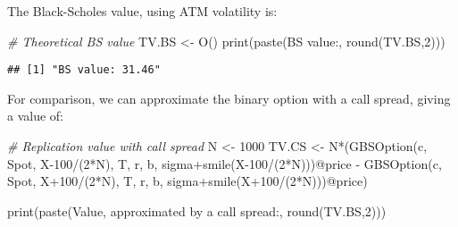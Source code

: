 \documentclass[]{tufte-book}
\newenvironment{Shaded}{}{}
\newcommand{\CommentTok}[1]{\textcolor[rgb]{0.38,0.63,0.69}{\textit{#1}}}
\newcommand{\DecValTok}[1]{\textcolor[rgb]{0.25,0.63,0.44}{#1}}
\newcommand{\FunctionTok}[1]{\textcolor[rgb]{0.02,0.16,0.49}{#1}}
\newcommand{\NormalTok}[1]{#1}
\newcommand{\OtherTok}[1]{\textcolor[rgb]{0.00,0.44,0.13}{#1}}
\newcommand{\SpecialCharTok}[1]{\textcolor[rgb]{0.25,0.44,0.63}{#1}}
\newcommand{\StringTok}[1]{\textcolor[rgb]{0.25,0.44,0.63}{#1}}
\begin{document}
The Black-Scholes value, using ATM volatility is:

\begin{Shaded}
\begin{Highlighting}[]
  \CommentTok{\# Theoretical BS value}
\NormalTok{  TV.BS }\OtherTok{\textless{}{-}} \FunctionTok{O}\NormalTok{()}
  \FunctionTok{print}\NormalTok{(}\FunctionTok{paste}\NormalTok{(}\StringTok{\textquotesingle{}BS value:\textquotesingle{}}\NormalTok{, }\FunctionTok{round}\NormalTok{(TV.BS,}\DecValTok{2}\NormalTok{)))}
\end{Highlighting}
\end{Shaded}

\begin{verbatim}
## [1] "BS value: 31.46"
\end{verbatim}

For comparison, we can approximate the binary option with a call spread,
giving a value of:

\begin{Shaded}
\begin{Highlighting}[]
  \CommentTok{\# Replication value with call spread}
\NormalTok{  N }\OtherTok{\textless{}{-}} \DecValTok{1000}
\NormalTok{  TV.CS }\OtherTok{\textless{}{-}}\NormalTok{ N}\SpecialCharTok{*}\NormalTok{(}\FunctionTok{GBSOption}\NormalTok{(}\StringTok{\textquotesingle{}c\textquotesingle{}}\NormalTok{, Spot, X}\DecValTok{{-}100}\SpecialCharTok{/}\NormalTok{(}\DecValTok{2}\SpecialCharTok{*}\NormalTok{N), T, r, b, sigma}\SpecialCharTok{+}\FunctionTok{smile}\NormalTok{(X}\DecValTok{{-}100}\SpecialCharTok{/}\NormalTok{(}\DecValTok{2}\SpecialCharTok{*}\NormalTok{N)))}\SpecialCharTok{@}\NormalTok{price }\SpecialCharTok{{-}}
              \FunctionTok{GBSOption}\NormalTok{(}\StringTok{\textquotesingle{}c\textquotesingle{}}\NormalTok{, Spot, X}\SpecialCharTok{+}\DecValTok{100}\SpecialCharTok{/}\NormalTok{(}\DecValTok{2}\SpecialCharTok{*}\NormalTok{N), T, r, b, sigma}\SpecialCharTok{+}\FunctionTok{smile}\NormalTok{(X}\SpecialCharTok{+}\DecValTok{100}\SpecialCharTok{/}\NormalTok{(}\DecValTok{2}\SpecialCharTok{*}\NormalTok{N)))}\SpecialCharTok{@}\NormalTok{price)}

  \FunctionTok{print}\NormalTok{(}\FunctionTok{paste}\NormalTok{(}\StringTok{\textquotesingle{}Value, approximated by a call spread:\textquotesingle{}}\NormalTok{, }\FunctionTok{round}\NormalTok{(TV.BS,}\DecValTok{2}\NormalTok{)))}
\end{Highlighting}
\end{Shaded}
\end{document}
